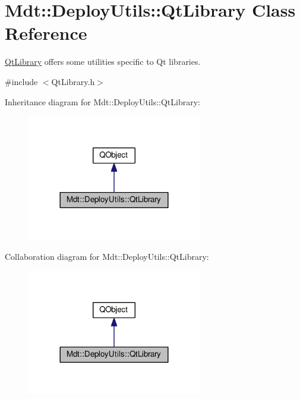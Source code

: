 \hypertarget{class_mdt_1_1_deploy_utils_1_1_qt_library}{}\section{Mdt\+:\+:Deploy\+Utils\+:\+:Qt\+Library Class Reference}
\label{class_mdt_1_1_deploy_utils_1_1_qt_library}


\hyperlink{class_mdt_1_1_deploy_utils_1_1_qt_library}{Qt\+Library} offers some utilities specific to Qt libraries.  




{\ttfamily \#include $<$Qt\+Library.\+h$>$}



Inheritance diagram for Mdt\+:\+:Deploy\+Utils\+:\+:Qt\+Library\+:
\nopagebreak
\begin{figure}[H]
\begin{center}
\leavevmode
\includegraphics[width=216pt]{class_mdt_1_1_deploy_utils_1_1_qt_library__inherit__graph}
\end{center}
\end{figure}


Collaboration diagram for Mdt\+:\+:Deploy\+Utils\+:\+:Qt\+Library\+:
\nopagebreak
\begin{figure}[H]
\begin{center}
\leavevmode
\includegraphics[width=216pt]{class_mdt_1_1_deploy_utils_1_1_qt_library__coll__graph}
\end{center}
\end{figure}

